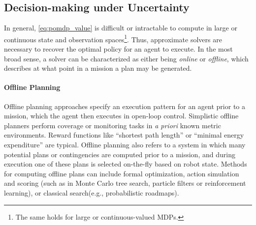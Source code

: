 
\subsection{Decision-making under Uncertainty}
In general, \cref{eq:pomdp_value} is difficult or intractable to compute in large or continuous state and observation spaces\footnote{The same holds for large or continuous-valued MDPs.}.
Thus, approximate solvers are necessary to recover the optimal policy for an agent to execute.
In the most broad sense, a solver can be characterized as either being \emph{online} or \emph{offline}, which describes at what point in a mission a plan may be generated.

\paragraph{Offline Planning}
Offline planning approaches specify an execution pattern for an agent prior to a mission, which the agent then executes in open-loop control.
Simplistic offline planners perform coverage or monitoring tasks\autocite{nikolos2003evolutionary,nam2016approach} in \emph{a priori} known metric environments.
Reward functions like ``shortest path length'' or ``minimal energy expenditure'' are typical.
Offline planning also refers to a system in which many potential plans or contingencies are computed prior to a mission, and during execution one of these plans is selected on-the-fly based on robot state\autocite{roa2012power}.
Methods for computing offline plans can include formal optimization, action simulation and scoring (such as in Monte Carlo tree search, particle filters or reinforcement learning)\autocite{yu2021combo,Arora2017,raja2012optimal}, or classical search(e.g., probabilistic roadmaps)\autocite{karaman2011sampling,karaman2011anytime}.

